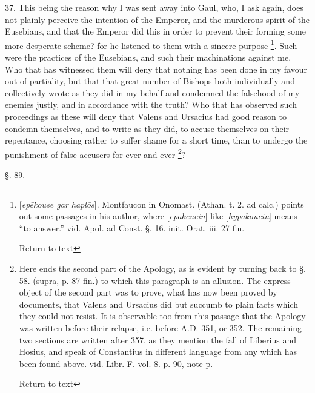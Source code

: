 37. This being the reason why I was sent away
into Gaul, who, I ask again, does not plainly perceive the intention
of the Emperor, and the murderous spirit of the Eusebians, and that
the Emperor did this in order to prevent their forming some more
desperate scheme? for he listened to them with a sincere purpose \footnote{[\emph{ep\={e}kouse gar hapl\={o}s}]. Montfaucon in Onomast. (Athan.
t. 2. ad calc.) points out some passages in his author, where [\emph{epakeuein}]
like [\emph{hypakouein}] means ``to answer.'' vid. Apol. ad Const. §.
16. init. Orat. iii. 27 fin.

Return to text}. Such were the practices of the Eusebians, and such their
machinations against me. Who that has witnessed them will deny that
nothing has been done in my favour out of partiality, but that that
great number of Bishops both individually and collectively wrote as
they did in my behalf and condemned the falsehood of my enemies
justly, and in accordance with the truth? Who that has observed such
proceedings as these will deny that Valens and Ursacius had good
reason to condemn themselves, and to write as they did, to accuse
themselves on their repentance, choosing rather to suffer shame for a
short time, than to undergo the punishment of false accusers for ever
and ever \footnote{Here ends the second part of the Apology, as is evident by turning
back to §. 58. (supra, p. 87 fin.) to which this paragraph is an
allusion. The express object of the second part was to prove, what has
now been proved by documents, that Valens and Ursacius did but succumb
to plain facts which they could not resist. It is observable too from
this passage that the Apology was written before their relapse, i.e.
before A.D. 351, or 352. The remaining two
sections are written after 357, as they mention the fall of Liberius
and Hosius, and speak of Constantius in different language from any
which has been found above. vid. Libr. F. vol. 8. p. 90, note p.

Return to text

}?

§. 89.


